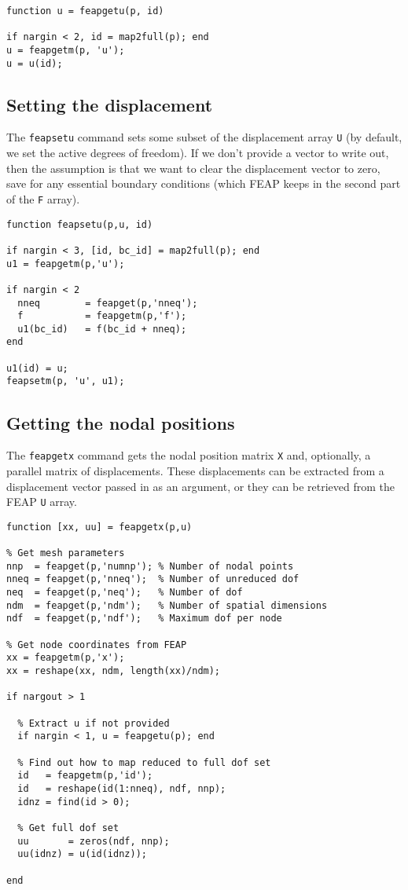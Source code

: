 \begin{verbatim}
function u = feapgetu(p, id)

if nargin < 2, id = map2full(p); end
u = feapgetm(p, 'u');
u = u(id);
\end{verbatim}
\subsection{Setting the displacement}

The {\tt feapsetu} command sets some subset of the displacement
array {\tt U} (by default, we set the active degrees of
freedom).  If we don't provide a vector to write out, then the
assumption is that we want to clear the displacement vector to
zero, save for any essential boundary conditions (which FEAP
keeps in the second part of the {\tt F} array).

\begin{verbatim}
function feapsetu(p,u, id)

if nargin < 3, [id, bc_id] = map2full(p); end
u1 = feapgetm(p,'u');

if nargin < 2
  nneq        = feapget(p,'nneq');
  f           = feapgetm(p,'f');
  u1(bc_id)   = f(bc_id + nneq);
end

u1(id) = u;
feapsetm(p, 'u', u1);
\end{verbatim}
\subsection{Getting the nodal positions}

The {\tt feapgetx} command gets the nodal position matrix {\tt X}
and, optionally, a parallel matrix of displacements.  These
displacements can be extracted from a displacement vector passed
in as an argument, or they can be retrieved from the FEAP {\tt U}
array.

\begin{verbatim}
function [xx, uu] = feapgetx(p,u)

% Get mesh parameters
nnp  = feapget(p,'numnp'); % Number of nodal points
nneq = feapget(p,'nneq');  % Number of unreduced dof
neq  = feapget(p,'neq');   % Number of dof
ndm  = feapget(p,'ndm');   % Number of spatial dimensions
ndf  = feapget(p,'ndf');   % Maximum dof per node

% Get node coordinates from FEAP
xx = feapgetm(p,'x');
xx = reshape(xx, ndm, length(xx)/ndm);

if nargout > 1

  % Extract u if not provided
  if nargin < 1, u = feapgetu(p); end

  % Find out how to map reduced to full dof set
  id   = feapgetm(p,'id');
  id   = reshape(id(1:nneq), ndf, nnp);
  idnz = find(id > 0);

  % Get full dof set
  uu       = zeros(ndf, nnp);
  uu(idnz) = u(id(idnz));

end
\end{verbatim}
